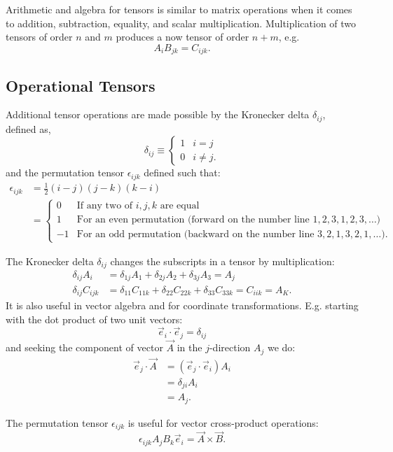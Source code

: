 Arithmetic and algebra for tensors is similar to matrix operations when it comes to addition, subtraction, equality, and scalar multiplication.
Multiplication of two tensors of order $n$ and $m$ produces a now tensor of order $n + m$, e.g.
\begin{equation*}
  A_i B_{jk} = C_{ijk}
.\end{equation*}


\subsection{Operational Tensors}

Additional tensor operations are made possible by the Kronecker delta $\delta_{ij}$, defined as,
\begin{equation*}
  \delta_{ij} \equiv \begin{cases}
    1 & i = j\\
  0 & i \neq j
  .\end{cases}
\end{equation*}
and the permutation tensor $\epsilon_{ijk}$ defined such that:
\begin{align*}
  \epsilon_{ijk} &= \frac{1}{2} (i-j)(j-k)(k-i) \\
                 &= \begin{cases}
    0 & \text{If any two of } i, j, k \text{ are equal}\\
  1 & \text{For an even permutation (forward on the number line } 1,2,3,1,2,3,\ldots ) \\
  -1 & \text{For an odd permutation (backward on the number line } 3,2,1,3,2,1,\ldots )
  .\end{cases}
\end{align*}

The Kronecker delta $\delta_{ij}$ changes the subscripts in a tensor by multiplication:
\begin{align*}
  \delta_{ij} A_i &= \delta_{1j} A_1 + \delta_{2j} A_2 + \delta_{3j} A_3 = A_j \\
  \delta_{ij} C_{ijk} &= \delta_{11} C_{11k} + \delta_{22} C_{22k} + \delta_{33} C_{33k} = C_{iik} = A_K
.\end{align*}
It is also useful in vector algebra and for coordinate transformations. E.g. starting with the dot product of two unit vectors:
\begin{equation}
  \Vec{e}_i \cdot \Vec{e}_j = \delta_{ij}
\end{equation}
and seeking the component of vector $\Vec{A}$ in the $j$-direction $A_j$ we do:
\begin{align*}
  \Vec{e}_j \cdot \Vec{A} &= \left( \Vec{e}_j \cdot \Vec{e}_i \right)A_i \\
  &= \delta_{ji} A_i \\
  &= A_j
.\end{align*}

The permutation tensor $\epsilon_{ijk}$ is useful for vector cross-product operations:
\begin{equation*}
  \epsilon_{ijk} A_j B_k \Vec{e}_i = \Vec{A} \times \Vec{B}
.\end{equation*}

